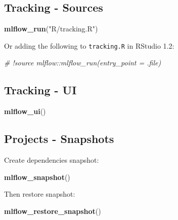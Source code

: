 \documentclass[]{article}
\newenvironment{Shaded}{\begin{snugshade}}{\end{snugshade}}
\newcommand{\CommentTok}[1]{\textcolor[rgb]{0.56,0.35,0.01}{\textit{#1}}}
\newcommand{\KeywordTok}[1]{\textcolor[rgb]{0.13,0.29,0.53}{\textbf{#1}}}
\newcommand{\NormalTok}[1]{#1}
\newcommand{\StringTok}[1]{\textcolor[rgb]{0.31,0.60,0.02}{#1}}
\begin{document}
\hypertarget{tracking---sources}{%
\subsection{Tracking - Sources}\label{tracking---sources}}

\begin{Shaded}
\begin{Highlighting}[]
\KeywordTok{mlflow_run}\NormalTok{(}\StringTok{"R/tracking.R"}\NormalTok{)}
\end{Highlighting}
\end{Shaded}

Or adding the following to \texttt{tracking.R} in RStudio 1.2:

\begin{Shaded}
\begin{Highlighting}[]
\CommentTok{# !source mlflow::mlflow_run(entry_point = .file)}
\end{Highlighting}
\end{Shaded}

\hypertarget{tracking---ui}{%
\subsection{Tracking - UI}\label{tracking---ui}}

\begin{Shaded}
\begin{Highlighting}[]
\KeywordTok{mlflow_ui}\NormalTok{()}
\end{Highlighting}
\end{Shaded}

\hypertarget{projects---snapshots}{%
\subsection{Projects - Snapshots}\label{projects---snapshots}}

Create dependencies snapshot:

\begin{Shaded}
\begin{Highlighting}[]
\KeywordTok{mlflow_snapshot}\NormalTok{()}
\end{Highlighting}
\end{Shaded}

Then restore snapshot:

\begin{Shaded}
\begin{Highlighting}[]
\KeywordTok{mlflow_restore_snapshot}\NormalTok{()}
\end{Highlighting}
\end{Shaded}
\end{document}
